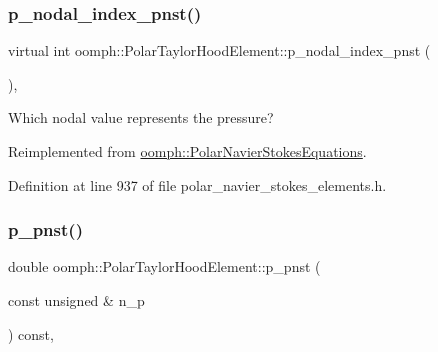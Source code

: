 \mbox{\label{classoomph_1_1PolarTaylorHoodElement_af7ced5d7811bc4f5f5d86c211cb40500}} 
\subsubsection{\texorpdfstring{p\+\_\+nodal\+\_\+index\+\_\+pnst()}{p\_nodal\_index\_pnst()}}
{\footnotesize\ttfamily virtual int oomph\+::\+Polar\+Taylor\+Hood\+Element\+::p\+\_\+nodal\+\_\+index\+\_\+pnst (\begin{DoxyParamCaption}{ }\end{DoxyParamCaption})\hspace{0.3cm}{\ttfamily [inline]}, {\ttfamily [virtual]}}



Which nodal value represents the pressure? 



Reimplemented from \hyperlink{classoomph_1_1PolarNavierStokesEquations_a79266ebf090ed45e71631e9c704f33a5}{oomph\+::\+Polar\+Navier\+Stokes\+Equations}.



Definition at line 937 of file polar\+\_\+navier\+\_\+stokes\+\_\+elements.\+h.

\mbox{\label{classoomph_1_1PolarTaylorHoodElement_a0ddfef8a7a5ab18b920a498be2d92cba}} 
\subsubsection{\texorpdfstring{p\+\_\+pnst()}{p\_pnst()}}
{\footnotesize\ttfamily double oomph\+::\+Polar\+Taylor\+Hood\+Element\+::p\+\_\+pnst (\begin{DoxyParamCaption}\item[{const unsigned \&}]{n\+\_\+p }\end{DoxyParamCaption}) const\hspace{0.3cm}{\ttfamily [inline]}, {\ttfamily [virtual]}}



